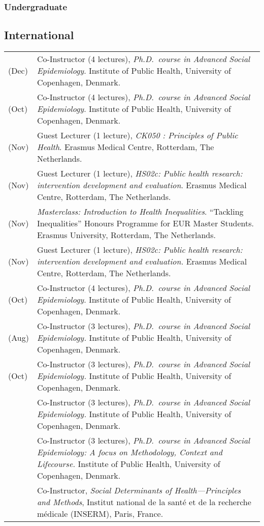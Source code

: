\documentclass[
  letterpaper,
  DIV=11,
  numbers=noendperiod]{scrartcl}
\begin{document}
\subsubsection{Undergraduate}\label{undergraduate}

\subsection{International}\label{international}

\begin{longtable}[]{@{}
  >{\raggedright\arraybackslash}p{}
  >{\raggedright\arraybackslash}p{}@{}}
\toprule\noalign{}
\endhead
\bottomrule\noalign{}
\endlastfoot
2024 (Dec) & Co-Instructor (4 lectures), \emph{Ph.D.~course in Advanced
Social Epidemiology}. Institute of Public Health, University of
Copenhagen, Denmark. \\
2021 (Oct) & Co-Instructor (4 lectures), \emph{Ph.D.~course in Advanced
Social Epidemiology}. Institute of Public Health, University of
Copenhagen, Denmark. \\
2021 (Nov) & Guest Lecturer (1 lecture), \emph{CK050 : Principles of
Public Health}. Erasmus Medical Centre, Rotterdam, The Netherlands. \\
2020 (Nov) & Guest Lecturer (1 lecture), \emph{HS02c: Public health
research: intervention development and evaluation}. Erasmus Medical
Centre, Rotterdam, The Netherlands. \\
2019 (Nov) & \emph{Masterclass: Introduction to Health Inequalities}.
``Tackling Inequalities'' Honours Programme for EUR Master Students.
Erasmus University, Rotterdam, The Netherlands. \\
2019 (Nov) & Guest Lecturer (1 lecture), \emph{HS02c: Public health
research: intervention development and evaluation.} Erasmus Medical
Centre, Rotterdam, The Netherlands. \\
2019 (Oct) & Co-Instructor (4 lectures), \emph{Ph.D.~course in Advanced
Social Epidemiology}. Institute of Public Health, University of
Copenhagen, Denmark. \\
2017 (Aug) & Co-Instructor (3 lectures), \emph{Ph.D.~course in Advanced
Social Epidemiology.} Institute of Public Health, University of
Copenhagen, Denmark. \\
2015 (Oct) & Co-Instructor (3 lectures), \emph{Ph.D.~course in Advanced
Social Epidemiology.} Institute of Public Health, University of
Copenhagen, Denmark. \\
2012 & Co-Instructor (3 lectures), \emph{Ph.D.~course in Advanced Social
Epidemiology.} Institute of Public Health, University of Copenhagen,
Denmark. \\
2011 & Co-Instructor (3 lectures), \emph{Ph.D.~course in Advanced Social
Epidemiology: A focus on Methodology, Context and Lifecourse.} Institute
of Public Health, University of Copenhagen, Denmark. \\
2009 & Co-Instructor, \emph{Social Determinants of Health---Principles
and Methods}, Institut national de la santé et de la recherche médicale
(INSERM), Paris, France. \\
\end{longtable}
\end{document}
